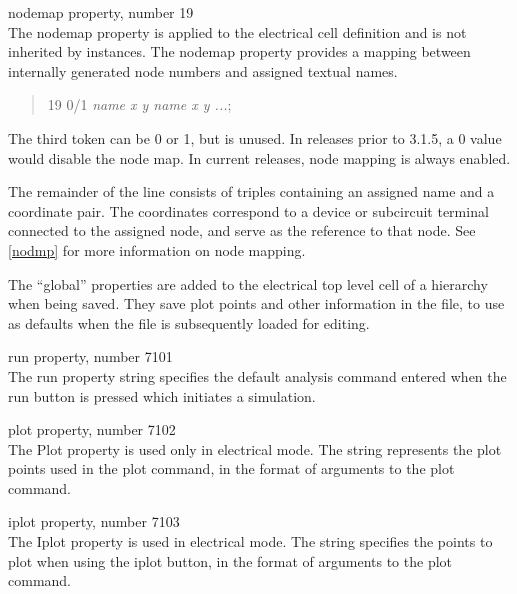 \begin{description}
\item{\et nodemap} property, number 19\\
The {\et nodemap} property is applied to the electrical cell
definition and is not inherited by instances.  The {\et nodemap}
property provides a mapping between internally generated node numbers
and assigned textual names. 

\begin{quote} 19 0/1 {\it name x y name x y ...\/};
\end{quote}

The third token can be 0 or 1, but is unused.  In releases prior to
3.1.5, a 0 value would disable the node map.  In current releases,
node mapping is always enabled.

The remainder of the line consists of triples containing an assigned
name and a coordinate pair.  The coordinates correspond to a device or
subcircuit terminal connected to the assigned node, and serve as the
reference to that node.  See \ref{nodmp} for more information on node
mapping.
\end{description}

The ``global'' properties are added to the electrical top level cell
of a hierarchy when being saved.  They save plot points and other
information in the file, to use as defaults when the file is
subsequently loaded for editing.

\begin{description}
\item{\et run} property, number 7101\\
The {\et run} property string specifies the default analysis command
entered when the {\cb run} button is pressed which initiates a
simulation.

\item{\et plot} property, number 7102\\
The {\et Plot} property is used only in electrical mode.  The string
represents the plot points used in the {\cb plot} command, in the
format of arguments to the {\WRspice} {\vt plot} command.

\item{\et iplot} property, number 7103\\
The {\et Iplot} property is used in electrical mode.  The string
specifies the points to plot when using the {\cb iplot} button, in the
format of arguments to the {\WRspice} {\vt plot} command.
\end{description}

